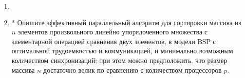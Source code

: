 \documentclass[11pt]{article}
\newenvironment{exercise}{\item}{}
\newcommand{\solution}[1]{}
\begin{document}
\begin{enumerate}
\begin{exercise}
\solution{
Пусть $n \geq p^2$.
Разрезаем граф посередине. Верхняя и нижняя половины обе распадаются на $\sqrt n \geq p$ 
независимых подграфов размера $\sqrt n$.
Распределяем их равномерно между процессорами.
Одна синхронизация посередине.}

\end{exercise}

\begin{exercise}*
Опишите эффективный параллельный алгоритм для сортировки массива из $n$ элементов 
произвольного линейно упорядоченного множества
с элементарной операцией сравнения двух элементов,
в модели BSP с оптимальной трудоемкостью и коммуникацией, 
и минимально возможным количеством синхронизаций;
при этом можно предположить, что размер массива $n$ достаточно велик 
по сравнению с количеством процессоров $p$.
\end{exercise}

\end{enumerate}
\end{document}
